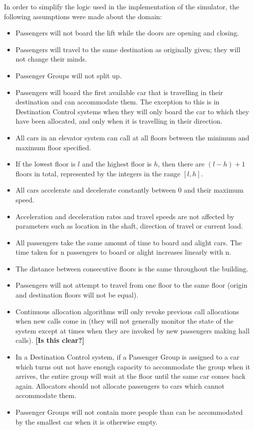 \documentclass{UoYCSproject}
\begin{document}
In order to simplify the logic used in the implementation of the simulator, the following assumptions were made about the domain:
	\begin{itemize}
		\item Passengers will not board the lift while the doors are opening and closing.
		\item Passengers will travel to the same destination as originally given; they will not change their minds.
		\item Passenger Groups will not split up.
		\item Passengers will board the first available car that is travelling in their destination and can accommodate them.  The exception to this is in Destination Control systems when they will only board the car to which they have been allocated, and only when it is travelling in their direction.
		\item All cars in an elevator system can call at all floors between the minimum and maximum floor specified.
		\item If the lowest floor is $l$ and the highest floor is $h$, then there are $(l-h)+1$ floors in total, represented by the integers in the range $[l, h]$.
		\item All cars accelerate and decelerate constantly between 0 and their maximum speed.
		\item Acceleration and deceleration rates and travel speeds are not affected by parameters such as location in the shaft, direction of travel or current load.
		\item All passengers take the same amount of time to board and alight cars.  The time taken for n passengers to board or alight increases linearly with n.
		\item The distance between consecutive floors is the same throughout the building.
		\item Passengers will not attempt to travel from one floor to the same floor (origin and destination floors will not be equal).
		\item Continuous allocation algorithms will only revoke previous call allocations when new calls come in (they will not generally monitor the state of the system except at times when they are invoked by new passengers making hall calls). \textbf{[Is this clear?]}
		\item In a Destination Control system, if a Passenger Group is assigned to a car which turns out not have enough capacity to accommodate the group when it arrives, the entire group will wait at the floor until the same car comes back again.  Allocators should not allocate passengers to cars which cannot accommodate them.
		\item Passenger Groups will not contain more people than can be accommodated by the smallest car when it is otherwise empty.
	\end{itemize}
\end{document}
